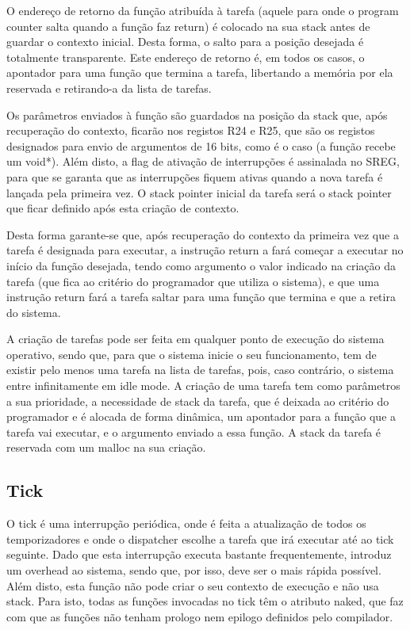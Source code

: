 \documentclass[journal]{IEEEtran}
\begin{document}
O endereço de retorno da função atribuída à tarefa (aquele para onde o program counter salta quando a função faz return) é colocado na sua stack antes de guardar o
contexto inicial.
Desta forma, o salto para a posição desejada é totalmente transparente.
Este endereço de retorno é, em todos os casos, o apontador para uma função que termina a tarefa, libertando a memória por ela reservada e retirando-a da lista de tarefas.

Os parâmetros enviados à função são guardados na posição da stack que, após recuperação do contexto, ficarão nos registos R24 e R25, que são os registos designados para
envio de argumentos de 16 bits, como é o caso (a função recebe um void*).
Além disto, a flag de ativação de interrupções é assinalada no SREG, para que se garanta que as interrupções fiquem ativas quando a nova tarefa é lançada pela primeira
vez.
O stack pointer inicial da tarefa será o stack pointer que ficar definido após esta criação de contexto.

Desta forma garante-se que, após recuperação do contexto da primeira vez que a tarefa é designada para executar, a instrução return a fará começar a executar no início da
função desejada, tendo como argumento o valor indicado na criação da tarefa (que fica ao critério do programador que utiliza o sistema), e que uma instrução return fará a
tarefa saltar para uma função que termina e que a retira do sistema.

A criação de tarefas pode ser feita em qualquer ponto de execução do sistema operativo, sendo que, para que o sistema inicie o seu funcionamento, tem de existir pelo
menos uma tarefa na lista de tarefas, pois, caso contrário, o sistema entre infinitamente em idle mode.
A criação de uma tarefa tem como parâmetros a sua prioridade, a necessidade de stack da tarefa, que é deixada ao critério do programador e é alocada de forma dinâmica, 
um apontador para a função que a tarefa vai executar, e o argumento enviado a essa função.
A stack da tarefa é reservada com um malloc na sua criação.

\subsection{Tick}
O tick é uma interrupção periódica, onde é feita a atualização de todos os temporizadores e onde o dispatcher escolhe a tarefa que irá executar até ao tick seguinte.
Dado que esta interrupção executa bastante frequentemente, introduz um overhead ao sistema, sendo que, por isso, deve ser o mais rápida possível.
Além disto, esta função não pode criar o seu contexto de execução e não usa stack.
Para isto, todas as funções invocadas no tick têm o atributo naked, que faz com que as funções não tenham prologo nem epilogo definidos pelo compilador.
\end{document}
